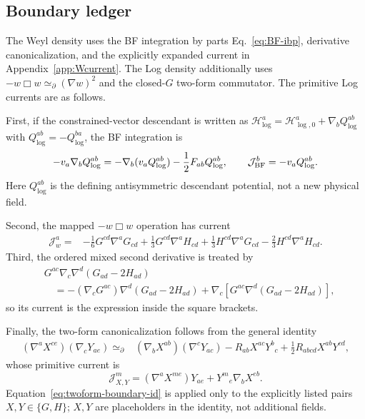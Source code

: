 \documentclass[11pt]{article}
\newcommand{\simeqbd}{\mathrel{\simeq}_{\partial}}
\newcommand{\Log}{\log}
\begin{document}
\subsection{Boundary ledger}

The Weyl density uses the BF integration by parts
Eq.~\eqref{eq:BF-ibp}, derivative canonicalization, and the explicitly
expanded current in Appendix~\ref{app:Wcurrent}.  The Log density additionally
uses $-w\Box w\simeqbd(\nabla w)^2$ and the closed-$G$ two-form commutator.
The primitive Log currents are as follows.

First, if the constrained-vector descendant is written as
$\mathcal H_{\Log}^a=\mathcal H_{\Log,0}^a+\nabla_bQ_{\Log}^{ab}$ with
$Q_{\Log}^{ab}=-Q_{\Log}^{ba}$, the BF integration is
\begin{equation}
-v_a\nabla_bQ_{\Log}^{ab}
=-\nabla_b(v_aQ_{\Log}^{ab})-\frac12F_{ab}Q_{\Log}^{ab},
\qquad \mathcal J_{\rm BF}^b=-v_aQ_{\Log}^{ab}.
\end{equation}
Here $Q_{\Log}^{ab}$ is the defining antisymmetric descendant potential, not
a new physical field.

Second, the mapped $-w\Box w$ operation has current
\begin{align}
\mathcal J_w^a={}&-\frac16G^{cd}\nabla^aG_{cd}
+\frac13G^{cd}\nabla^aH_{cd}
+\frac13H^{cd}\nabla^aG_{cd}
-\frac23H^{cd}\nabla^aH_{cd}.
\end{align}
Third, the ordered mixed second derivative is treated by
\begin{align}
&G^{ac}\nabla_c\nabla^d(G_{ad}-2H_{ad})
\nonumber\\
&\quad=-(\nabla_cG^{ac})\nabla^d(G_{ad}-2H_{ad})
+\nabla_c\!\left[G^{ac}\nabla^d(G_{ad}-2H_{ad})\right],
\label{eq:Log-mixed-current}
\end{align}
so its current is the expression inside the square brackets.

Finally, the two-form canonicalization follows from the general identity
\begin{align}
(\nabla^aX^{ce})(\nabla_cY_{ae})\simeqbd{}&
(\nabla_bX^{ab})(\nabla^cY_{ac})
-R_{ab}X^{ac}Y^b{}_c
+\frac12R_{abcd}X^{ab}Y^{cd},
\label{eq:twoform-boundary-id}
\end{align}
whose primitive current is
\begin{equation}
\mathcal J_{X,Y}^m=(\nabla^aX^{me})Y_{ae}
+Y^m{}_e\nabla_bX^{eb}.
\end{equation}
Equation~\eqref{eq:twoform-boundary-id} is applied only to the explicitly
listed pairs $X,Y\in\{G,H\}$; $X,Y$ are placeholders in the identity, not
additional fields.
\end{document}
